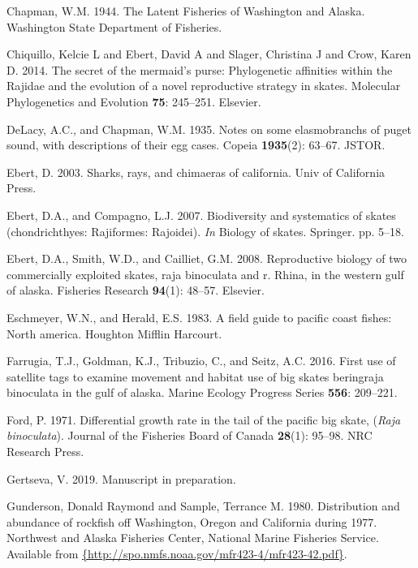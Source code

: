 \documentclass[12pt,]{article}
\begin{document}
\leavevmode\hypertarget{ref-Chapman1944}{}%
Chapman, W.M. 1944. The Latent Fisheries of Washington and Alaska.
Washington State Department of Fisheries.

\leavevmode\hypertarget{ref-Chiquillo2014}{}%
Chiquillo, Kelcie L and Ebert, David A and Slager, Christina J and Crow,
Karen D. 2014. The secret of the mermaid's purse: Phylogenetic
affinities within the Rajidae and the evolution of a novel reproductive
strategy in skates. Molecular Phylogenetics and Evolution \textbf{75}:
245--251. Elsevier.

\leavevmode\hypertarget{ref-DeLacy1935}{}%
DeLacy, A.C., and Chapman, W.M. 1935. Notes on some elasmobranchs of
puget sound, with descriptions of their egg cases. Copeia
\textbf{1935}(2): 63--67. JSTOR.

\leavevmode\hypertarget{ref-Ebert2003}{}%
Ebert, D. 2003. Sharks, rays, and chimaeras of california. Univ of
California Press.

\leavevmode\hypertarget{ref-Ebert2007}{}%
Ebert, D.A., and Compagno, L.J. 2007. Biodiversity and systematics of
skates (chondrichthyes: Rajiformes: Rajoidei). \emph{In} Biology of
skates. Springer. pp. 5--18.

\leavevmode\hypertarget{ref-Ebert2008}{}%
Ebert, D.A., Smith, W.D., and Cailliet, G.M. 2008. Reproductive biology
of two commercially exploited skates, raja binoculata and r. Rhina, in
the western gulf of alaska. Fisheries Research \textbf{94}(1): 48--57.
Elsevier.

\leavevmode\hypertarget{ref-Eschmeyer1983}{}%
Eschmeyer, W.N., and Herald, E.S. 1983. A field guide to pacific coast
fishes: North america. Houghton Mifflin Harcourt.

\leavevmode\hypertarget{ref-Farrugia2016}{}%
Farrugia, T.J., Goldman, K.J., Tribuzio, C., and Seitz, A.C. 2016. First
use of satellite tags to examine movement and habitat use of big skates
beringraja binoculata in the gulf of alaska. Marine Ecology Progress
Series \textbf{556}: 209--221.

\leavevmode\hypertarget{ref-Ford1971}{}%
Ford, P. 1971. Differential growth rate in the tail of the pacific big
skate, (\emph{Raja binoculata}). Journal of the Fisheries Board of
Canada \textbf{28}(1): 95--98. NRC Research Press.

\leavevmode\hypertarget{ref-Gertseva2019}{}%
Gertseva, V. 2019. Manuscript in preparation.

\leavevmode\hypertarget{ref-Gunderson1980}{}%
Gunderson, Donald Raymond and Sample, Terrance M. 1980. Distribution and
abundance of rockfish off Washington, Oregon and California during 1977.
Northwest and Alaska Fisheries Center, National Marine Fisheries
Service. Available from
\href{\%7Bhttp://spo.nmfs.noaa.gov/mfr423-4/mfr423-42.pdf\%7D}{\{http://spo.nmfs.noaa.gov/mfr423-4/mfr423-42.pdf\}}.
\end{document}
